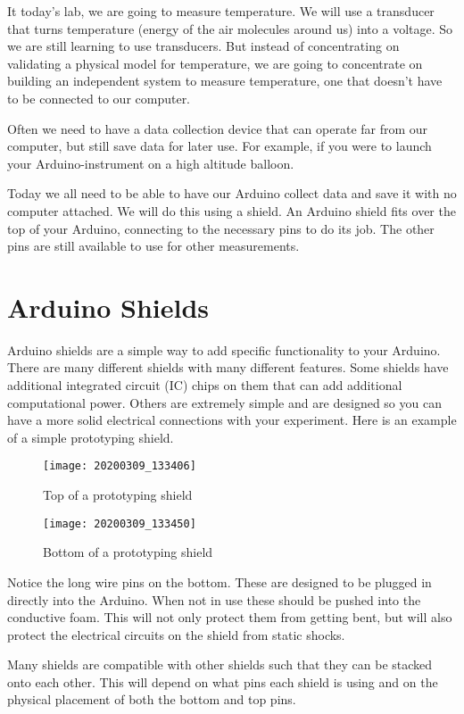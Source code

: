 It today's lab, we are going to measure temperature. We will use a transducer that turns temperature (energy of the air molecules around us) into a voltage. So we are still learning to use transducers. But instead of concentrating on validating a physical model for temperature, we are going to concentrate on building an independent system to measure temperature, one that doesn't have to be connected to our computer.

Often we need to have a data collection device that can operate far from our computer, but still save data for later use. For example, if you were to launch your Arduino-instrument on a high altitude balloon.

Today we all need to be able to have our Arduino collect data and save it with no computer attached. We will do this using a shield. An Arduino shield fits over the top of your Arduino, connecting to the necessary pins to do its job. The other pins are still available to use for other measurements. 

\section{Arduino Shields}
	Arduino shields are a simple way to add specific functionality to your Arduino. There are many different shields with many different features. Some shields have additional integrated circuit (IC) chips on them that can add additional computational power.  Others are extremely simple and are designed so you can have a more solid electrical connections with your experiment.  Here is an example of a simple prototyping shield.
	\begin{figure}[h!] 
		\caption{Top of a prototyping shield}
		\texttt{[image: 20200309\_133406]}
	\end{figure}
	\begin{figure}[h!] 
		\caption{Bottom of a prototyping shield}
		\texttt{[image: 20200309\_133450]}
	\end{figure}
	
	Notice the long wire pins on the bottom. These are designed to be plugged in directly into the Arduino. When not in use these should be pushed into the conductive foam. This will not only protect them from getting bent, but will also protect the electrical circuits on the shield from static shocks.
	
	Many shields are compatible with other shields such that they can be stacked onto each other. This will depend on what pins each shield is using and on the physical placement of both the bottom and top pins.
	
